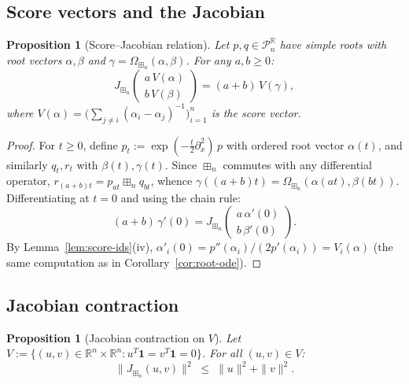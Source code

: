\documentclass[10pt,a4paper]{amsart}
\theoremstyle{plain}
\newtheorem{proposition}[theorem]{Proposition}
\theoremstyle{definition}
\theoremstyle{remark}
\newcommand{\R}{\mathbb{R}}
\newcommand{\PnR}[1][n]{\mathcal{P}^{\R}_{#1}}
\newcommand{\fp}{\boxplus_n}
\begin{document}
\subsection{Score vectors and the Jacobian}

\begin{proposition}[Score--Jacobian relation]
\label{prop:score-jac}
Let $p,q\in\PnR$ have simple roots with
root vectors $\alpha,\beta$ and
$\gamma=\Omega_{\fp}(\alpha,\beta)$.
For any $a,b\ge 0$:
\begin{equation}\label{eq:score-jac}
  J_{\fp}\begin{pmatrix}a\,V(\alpha)\\b\,V(\beta)\end{pmatrix}
  =(a+b)\,V(\gamma),
\end{equation}
where $V(\alpha)=\bigl(\sum_{j\ne i}(\alpha_i-\alpha_j)^{-1}\bigr)_{i=1}^n$
is the score vector.
\end{proposition}

\begin{proof}
For $t\ge 0$, define
$p_t:=\exp(-\tfrac{t}{2}\partial_x^2)\,p$
with ordered root vector $\alpha(t)$, and
similarly $q_t,r_t$ with $\beta(t),\gamma(t)$.
Since $\fp$ commutes with any differential
operator, $r_{(a+b)t}=p_{at}\fp q_{bt}$,
whence $\gamma((a+b)t)
=\Omega_{\fp}(\alpha(at),\beta(bt))$.
Differentiating at $t=0$ and using the chain rule:
\[
  (a+b)\,\gamma'(0)
  =J_{\fp}\begin{pmatrix}
    a\,\alpha'(0)\\b\,\beta'(0)
  \end{pmatrix}.
\]
By Lemma~\ref{lem:score-ids}\textup{(iv)},
$\alpha'_i(0)
=p''(\alpha_i)/(2p'(\alpha_i))
=V_i(\alpha)$
(the same computation as in
Corollary~\ref{cor:root-ode}).
\end{proof}

\subsection{Jacobian contraction}

\begin{proposition}[Jacobian contraction on $V$]
\label{prop:jac-contract}
Let $V:=\{(u,v)\in\R^n\times\R^n:
u^T\mathbf{1}=v^T\mathbf{1}=0\}$.
For all $(u,v)\in V$:
\begin{equation}\label{eq:jac-contract}
  \bigl\|J_{\fp}(u,v)\bigr\|^2
  \;\le\;\|u\|^2+\|v\|^2.
\end{equation}
\end{proposition}
\end{document}
